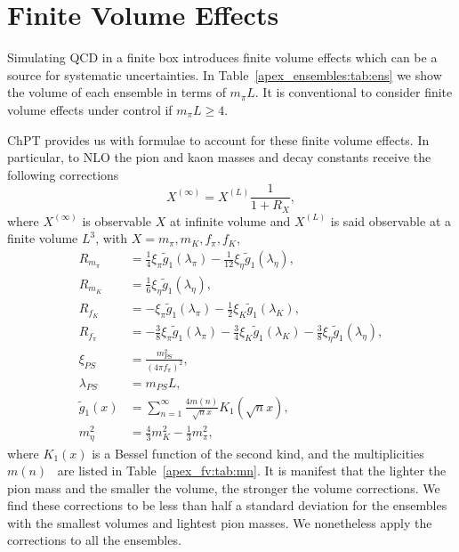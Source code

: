 
\chapter{Finite Volume Effects}
\label{apex_fv}

Simulating QCD in a finite box introduces finite volume effects which can be a source for systematic uncertainties. In Table~\ref{apex_ensembles:tab:ens} we show the volume of each ensemble in terms of $m_{\pi}L$. It is conventional to consider finite volume effects under control if $m_{\pi}L\geq4$.

ChPT provides us with formulae to account for these finite volume effects. In particular, to NLO the pion and kaon masses and decay constants receive the following corrections~\citep{Colangelo:2003hf,Colangelo:2005gd}
\begin{equation}
X^{(\infty)}=X^{(L)}\frac{1}{1+R_X},
\end{equation}
where $X^{(\infty)}$ is observable $X$ at infinite volume and $X^{(L)}$ is said observable at a finite volume $L^3$, with $X=m_{\pi},m_K,f_{\pi},f_K$,
\begin{align}
R_{m_{\pi}}&=\frac{1}{4}\xi_{\pi}\tilde{g}_1(\lambda_{\pi})-\frac{1}{12}\xi_{\eta}\tilde{g}_1(\lambda_{\eta}), \\
R_{m_K}&=\frac{1}{6}\xi_{\eta}\tilde{g}_1(\lambda_{\eta}), \\
R_{f_K}&=-\xi_{\pi}\tilde{g}_1(\lambda_{\pi})-\frac{1}{2}\xi_{K}\tilde{g}_1(\lambda_{K}), \\
R_{f_{\pi}}&=-\frac{3}{8}\xi_{\pi}\tilde{g}_1(\lambda_{\pi})-\frac{3}{4}\xi_{K}\tilde{g}_1(\lambda_{K})-\frac{3}{8}\xi_{\eta}\tilde{g}_1(\lambda_{\eta}), \\
\xi_{PS}&=\frac{m_{PS}^2}{(4\pi f_{\pi})^2}, \\
\lambda_{PS}&=m_{PS}L, \\
\tilde{g}_1(x)&=\sum_{n=1}^{\infty}\frac{4m(n)}{\sqrt{n}x}K_1(\sqrt{n}x), \\
m_{\eta}^2&=\frac{4}{3}m_K^2-\frac{1}{3}m_{\pi}^2,
\end{align}
where $K_1(x)$ is a Bessel function of the second kind, and the multiplicities $m(n)$~\citep{Colangelo:2003hf} are listed in Table~\ref{apex_fv:tab:mn}. It is manifest that the lighter the pion mass and the smaller the volume, the stronger the volume corrections. We find these corrections to be less than half a standard deviation for the ensembles with the smallest volumes and lightest pion masses. We nonetheless apply the corrections to all the ensembles.


